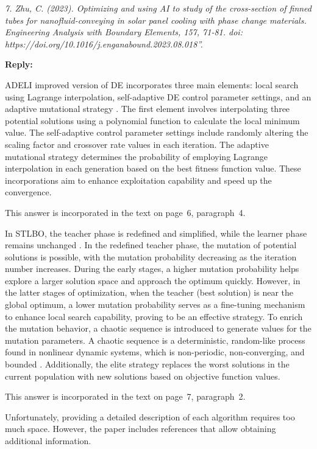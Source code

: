 \documentclass[a4paper,fleqn]{cas-sc}
\begin{document}
\emph{
7. Zhu, C. (2023).
Optimizing and using AI to study of the cross-section of finned
tubes for nanofluid-conveying in solar panel cooling with phase change materials.
Engineering Analysis with Boundary Elements, 157, 71-81.
doi: https://doi.org/10.1016/j.enganabound.2023.08.018''.
}

\noindent
\textcolor[rgb]{0.51,0.00,0.00}{\textbf{Reply:}}

ADELI improved version of DE incorporates three main elements:
local search using Lagrange interpolation, self-adaptive DE control parameter settings,
and an adaptive mutational strategy \cite{ADELI}.
The first element involves interpolating three potential solutions using a
polynomial function to calculate the local minimum value.
The self-adaptive control parameter settings include randomly altering the
scaling factor and crossover rate values in each iteration.
The adaptive mutational strategy determines the probability of
employing Lagrange interpolation in each generation based on the best fitness function value.
These incorporations aim to enhance exploitation capability and speed up the convergence.

This answer is incorporated in the text on page~6, paragraph~4.

In STLBO, the teacher phase is redefined and simplified, while the learner phase remains unchanged \cite{STLBO}.
In the redefined teacher phase, the mutation of potential solutions is possible,
with the mutation probability decreasing as the iteration number increases.
During the early stages, a higher mutation probability helps explore a larger solution space
and approach the optimum quickly.
However, in the latter stages of optimization, when the teacher (best solution) is near the global optimum,
a lower mutation probability serves as a fine-tuning mechanism
to enhance local search capability, proving to be an effective strategy.
To enrich the mutation behavior, a chaotic sequence is introduced to generate values for the mutation parameters.
A chaotic sequence is a deterministic, random-like process found in nonlinear dynamic systems,
which is non-periodic, non-converging, and bounded \cite{May1976}.
Additionally, the elite strategy replaces the worst solutions in the current population with new solutions based on objective function values.

This answer is incorporated in the text on page~7, paragraph~2.

Unfortunately, providing a detailed description of each algorithm requires too much space.
However, the paper includes references that allow obtaining additional information.
\end{document}
